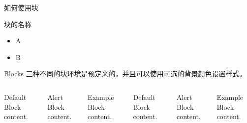 \documentclass[compress,aspectratio=43,10pt,UTF8]{ctexbeamer}
\begin{document}
\begin{frame}{如何使用块}
    \begin{block}{块的名称}
        \begin{itemize}
            \item A
            \item B
        \end{itemize}
    \end{block}	
\end{frame}

\begin{frame}{Blocks}
    三种不同的块环境是预定义的，并且可以使用可选的背景颜色设置样式。

    \begin{columns}[T,onlytextwidth]
        \begin{block}{Default}
            Block content.
        \end{block}

        \begin{alertblock}{Alert}
            Block content.
        \end{alertblock}

        \begin{exampleblock}{Example}
            Block content.
        \end{exampleblock}



        \begin{block}{Default}
            Block content.
        \end{block}

        \begin{alertblock}{Alert}
            Block content.
        \end{alertblock}

        \begin{exampleblock}{Example}
            Block content.
        \end{exampleblock}

    \end{columns}
\end{frame}
\end{document}
